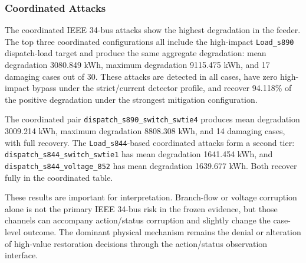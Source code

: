 \subsubsection{Coordinated Attacks}
\label{subsubsec:ieee34_coordinated}

The coordinated IEEE 34-bus attacks show the highest degradation in the feeder. The top three coordinated configurations all include the high-impact \texttt{Load\_s890} dispatch-load target and produce the same aggregate degradation: mean degradation 3080.849 kWh, maximum degradation 9115.475 kWh, and 17 damaging cases out of 30. These attacks are detected in all cases, have zero high-impact bypass under the strict/current detector profile, and recover 94.118\% of the positive degradation under the strongest mitigation configuration.

The coordinated pair \texttt{dispatch\_s890\_switch\_swtie4} produces mean degradation 3009.214 kWh, maximum degradation 8808.308 kWh, and 14 damaging cases, with full recovery. The \texttt{Load\_s844}-based coordinated attacks form a second tier: \texttt{dispatch\_s844\_switch\_swtie1} has mean degradation 1641.454 kWh, and \texttt{dispatch\_s844\_voltage\_852} has mean degradation 1639.677 kWh. Both recover fully in the coordinated table.

These results are important for interpretation. Branch-flow or voltage corruption alone is not the primary IEEE 34-bus risk in the frozen evidence, but those channels can accompany action/status corruption and slightly change the case-level outcome. The dominant physical mechanism remains the denial or alteration of high-value restoration decisions through the action/status observation interface.

